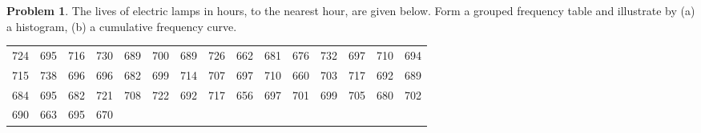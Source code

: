 \documentclass[11pt,a4paper]{article}
\theoremstyle{definition}
\newtheorem{problemx}{Problem}[section]
\newenvironment{problem}{\begin{problemx}}{\end{problemx}}
\begin{document}
\begin{problem}
The lives of electric lamps in hours, to the nearest hour, are given below. Form a grouped
frequency table and illustrate by (a) a histogram, (b) a cumulative frequency curve.
\begin{table}[H]
\centering
\begin{tabular}{ccccccccccccccc}
724 & 695 & 716 & 730 & 689 & 700 & 689 & 726 & 662 & 681 & 676 & 732 & 697 & 710 & 694\\
715 & 738 & 696 & 696 & 682 & 699 & 714 & 707 & 697 & 710 & 660 & 703 & 717 & 692 & 689\\
684 & 695 & 682 & 721 & 708 & 722 & 692 & 717 & 656 & 697 & 701 & 699 & 705 & 680 & 702\\
690 & 663 & 695 & 670 & & & & & & & & & & &\\
\end{tabular}
\end{table}
\end{problem}
\end{document}
